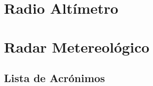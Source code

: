 \documentclass[a4paper,10pt,twoside]{book}
\begin{document}


\chapter{Radio Alt\'imetro}
\label{sec:radio.altimetro}



\chapter{Radar Metereol\'ogico}
\label{sec:radar.metereologico}

%    


\appendix
\newpage
\begin{appendices}

  \newpage

  \section{Lista de Acr\'onimos}
  \label{sec:lista.acronimos}


\end{appendices}

\newpage



%
%
\end{document}
